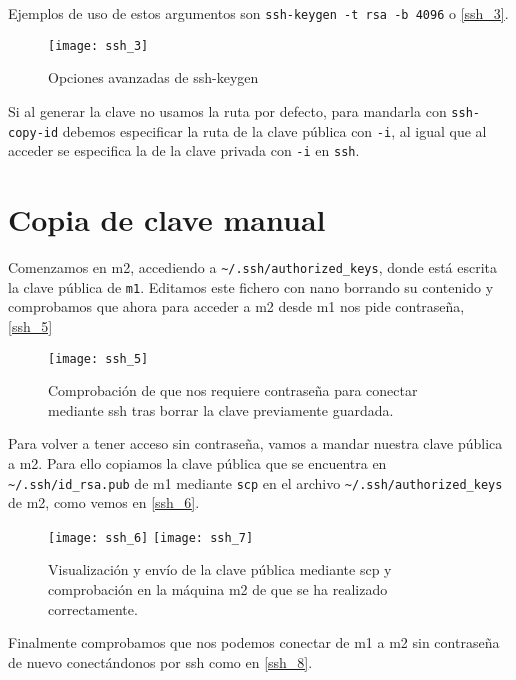 Ejemplos de uso de estos argumentos son \verb|ssh-keygen -t rsa -b 4096| o \eqref{ssh_3}.

\begin{figure}[h!]
\begin{center}
\caption{Opciones avanzadas de ssh-keygen}
\label{ssh_3}
\texttt{[image: ssh\_3]}
\end{center}
\end{figure}

Si al generar la clave no usamos la ruta por defecto, para mandarla con \verb|ssh-copy-id| debemos especificar la ruta de la clave pública con \verb|-i|, al igual que al acceder se especifica la de la clave privada con \verb|-i| en \verb|ssh|.

\section{Copia de clave manual}

Comenzamos en m2, accediendo a \verb|~/.ssh/authorized_keys|, donde está escrita la clave pública de \verb|m1|. Editamos este fichero con nano borrando su contenido y comprobamos que ahora para acceder a m2 desde m1 nos pide contraseña, \eqref{ssh_5}

\begin{figure}[h!]
\begin{center}
\caption{Comprobación de que nos requiere contraseña para conectar mediante ssh tras borrar la clave previamente guardada.}
\label{ssh_5}
\texttt{[image: ssh\_5]}
\end{center}
\end{figure}

Para volver a tener acceso sin contraseña, vamos a mandar nuestra clave pública a m2. Para ello copiamos la clave pública que se encuentra en \verb|~/.ssh/id_rsa.pub| de m1 mediante \verb|scp| en el archivo \verb|~/.ssh/authorized_keys| de m2, como vemos en \eqref{ssh_6}.

\begin{figure}[h!]
\begin{center}
\caption{Visualización y envío de la clave pública mediante scp y comprobación en la máquina m2 de que se ha realizado correctamente.}
\label{ssh_6}
\texttt{[image: ssh\_6]}
\texttt{[image: ssh\_7]}
\end{center}
\end{figure}

Finalmente comprobamos que nos podemos conectar de m1 a m2 sin contraseña de nuevo conectándonos por ssh como en \eqref{ssh_8}.


